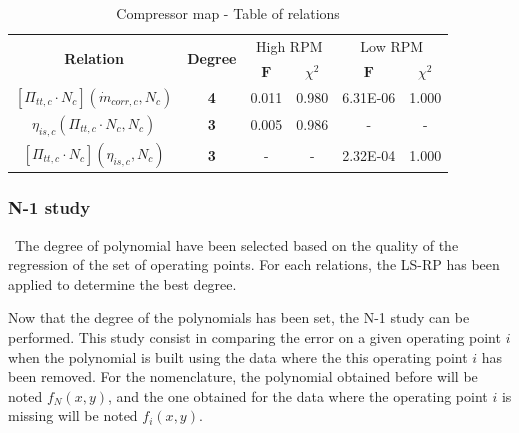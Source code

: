 \begin{longtable}[c]{@{}cccc|cc@{}}
\caption{Compressor map - Table of relations}
\label{tab:C7_compmaprel}\\
\toprule
\multicolumn{1}{c}{\multirow{2}{*}{\textbf{Relation}}} & \multicolumn{1}{c}{\multirow{2}{*}{\textbf{Degree}}} & \multicolumn{2}{c|}{High RPM}                  & \multicolumn{2}{c}{Low RPM}                   \\
\multicolumn{1}{c}{}                                            & \multicolumn{1}{c}{}                        & \multicolumn{1}{c}{$\mathbf{F}$}          & \multicolumn{1}{c|}{$\chi^2$}               & \multicolumn{1}{c}{$\mathbf{F}$}          & \multicolumn{1}{c}{$\chi^2$}               \\* \midrule
\endfirsthead
%
\endhead
%
\bottomrule
\endfoot
%
\endlastfoot
%
$[\Pi_{tt,c}\cdot N_c](\dot{m}_{corr,c},N_c)$                   & \multicolumn{1}{c}{\textbf{4}}                                           & 0.011
                 & 0.980
                  & 6.31E-06
      & 1.000                 \\
$\eta_{is,c}(\Pi_{tt,c}\cdot N_c,N_c)$                          & \multicolumn{1}{c}{\textbf{3}}                                           & 0.005             & 0.986                  & \multicolumn{1}{c}{-} & \multicolumn{1}{c}{-} \\
$[\Pi_{tt,c}\cdot N_c](\eta_{is,c},N_c)$                        & \multicolumn{1}{c}{\textbf{3}}                                           & \multicolumn{1}{c}{-} & \multicolumn{1}{c|}{-} & 2.32E-04              & 1.000                 \\* \bottomrule
\end{longtable}

\subsubsection{N-1 study}
\quad\ The degree of polynomial have been selected based on the quality of the regression of the set of operating points. For each relations, the LS-RP has been applied to determine the best degree.

Now that the degree of the polynomials has been set, the N-1 study can be performed. This study consist in comparing the error on a given operating point $i$ when the polynomial is built using the data where the this operating point $i$ has been removed. For the nomenclature, the polynomial obtained before will be noted $f_N(x,y)$, and the one obtained for the data where the operating point $i$ is missing will be noted $f_i(x,y)$.


